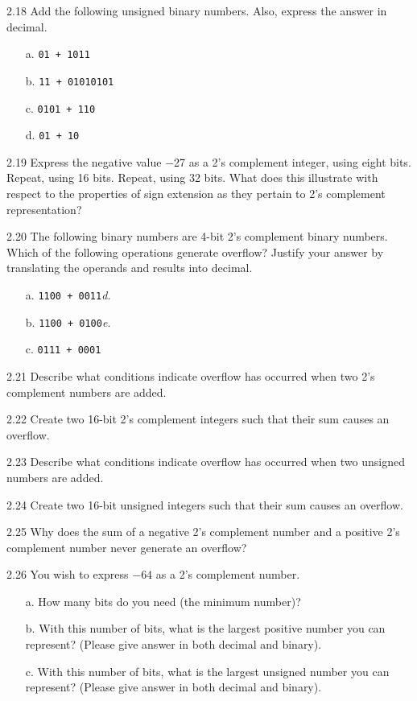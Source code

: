 \documentclass{patt}
\begin{document}
\begin{exercises}
\item[2.18] Add the following unsigned binary numbers. Also,
express the answer in decimal.
\begin{enumerate}[d.]
\item[a.] {\tt 01 + 1011}
\item[b.] {\tt 11 + 01010101}
\item[c.] {\tt 0101 + 110}
\item[d.] {\tt 01 + 10}
\end{enumerate}

\item[2.19] Express the negative value $-$27 as a 2's complement integer,
using eight bits. Repeat, using 16 bits. Repeat, using 32 bits. What does
this illustrate with respect to the properties of sign
extension as they pertain to 2's complement representation?

\item[2.20] The following binary numbers are 4-bit 2's complement binary numbers.
Which of the following operations generate overflow? Justify
your answer by translating the operands and results into decimal.
\begin{enumerate}[d.]
\item[a.] {\tt 1100 + 0011}\qquad\qquad\quad \textit{d.}
\item[b.] {\tt 1100 + 0100}\qquad\qquad\quad \textit{e.}
\item[c.] {\tt 0111 + 0001}
\end{enumerate}

\item[2.21] Describe what conditions indicate overflow has occurred
when two 2's complement numbers are added.

\item[2.22] Create two 16-bit 2's complement integers such
that their sum causes an overflow.

\item[2.23] Describe what conditions indicate overflow has
occurred when two unsigned numbers are added.

\item[2.24] Create two 16-bit unsigned integers such that their sum causes an overflow.

\item[2.25] Why does the sum of a negative 2's complement number and a
positive 2's complement number never generate an overflow?

\item[2.26] You wish to express ${-}64$ as a 2's complement number.
\begin{enumerate}[c.]
\item[a.] How many bits do you need (the minimum number)?
\item[b.] With this number of bits, what is the largest positive
  number you can represent? (Please give answer in both decimal and
  binary).
\item[c.] With this number of bits, what is the largest unsigned
  number you can represent? (Please give answer in both decimal and
  binary).
\end{enumerate}


\end{exercises}
\end{document}
